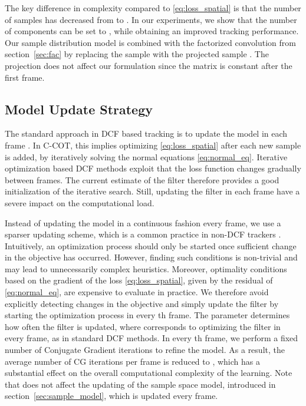 \documentclass[10pt,twocolumn,letterpaper]{article}
\begin{document}
The key difference in complexity compared to \eqref{eq:loss_spatial} is that the number of samples has decreased from  to . In our experiments, we show that the number of components  can be set to , while obtaining an improved tracking performance. Our sample distribution model  is combined with the factorized convolution from section~\ref{sec:fac} by replacing the sample   with the projected sample . The projection does not affect our formulation since the matrix  is constant after the first frame.

\subsection{Model Update Strategy}
\label{sec:optimization}

The standard approach in DCF based tracking is to update the model in each frame \cite{MOSSE2010,DanelljanICCV2015,Henriques14}. In C-COT, this implies optimizing \eqref{eq:loss_spatial} after each new sample is added, by iteratively solving the normal equations \eqref{eq:normal_eq}. Iterative optimization based DCF methods exploit that the loss function changes gradually between frames. The current estimate of the filter therefore provides a good initialization of the iterative search. Still, updating the filter in each frame have a severe impact on the computational load.

Instead of updating the model in a continuous fashion every frame, we use a sparser updating scheme, which is a common practice in non-DCF trackers \cite{MDNet,MEEM2014}. Intuitively, an optimization process should only be started once sufficient change in the objective has occurred. However, finding such conditions is non-trivial and may lead to unnecessarily complex heuristics. Moreover, optimality conditions based on the gradient of the loss \eqref{eq:loss_spatial}, given by the residual of \eqref{eq:normal_eq}, are expensive to evaluate in practice. We therefore avoid explicitly detecting changes in the objective and simply update the filter by starting the optimization process in every th frame. The parameter  determines how often the filter is updated, where  corresponds to optimizing the filter in every frame, as in standard DCF methods. In every th frame, we perform a fixed number of  Conjugate Gradient iterations to refine the model. As a result, the average number of CG iterations per frame is reduced to , which has a substantial effect on the overall computational complexity of the learning. Note that  does not affect the updating of the sample space model, introduced in section~\ref{sec:sample_model}, which is updated every frame. 
\end{document}
